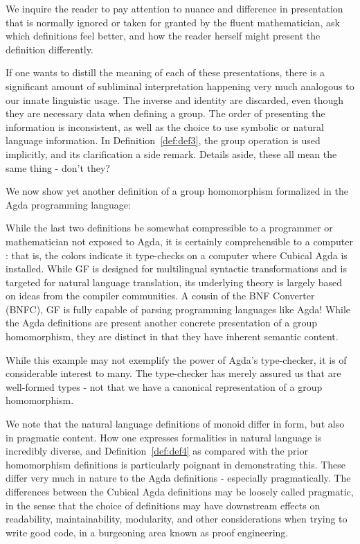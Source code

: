 We inquire the reader to pay attention to nuance and difference in presentation
that is normally ignored or taken for granted by the fluent mathematician, ask
which definitions feel better, and how the reader herself might present the
definition differently.

If one wants to distill the meaning of each of these presentations, there is a
significant amount of subliminal interpretation happening very much analogous to
our innate linguistic usage. The inverse and identity are discarded, even though
they are necessary data when defining a group. The order of presenting the
information is inconsistent, as well as the choice to use symbolic or natural
language information. In Definition~\ref{def:def3}, the group operation is used
implicitly, and its clarification a side remark. Details aside, these all mean
the same thing - don't they?


We now show yet another definition of a group homomorphism formalized in the
Agda programming language:



While the last two definitions be somewhat compressible to a programmer
or mathematician not exposed to Agda, it is certainly comprehensible to a
computer : that is, the colors indicate it type-checks on a computer where Cubical Agda is installed.
While GF is designed for multilingual syntactic transformations and is targeted
for natural language translation, its underlying theory is largely based on
ideas from the compiler communities. A cousin of the BNF Converter (BNFC), GF is
fully capable of parsing programming languages like Agda! While the Agda
definitions are present another concrete presentation of a group
homomorphism, they are distinct in that they have inherent semantic content.

While this example may not exemplify the power of Agda's type-checker, it is of
considerable interest to many. The type-checker has merely assured us that
 are well-formed types - not that we have a canonical representation
of a group homomorphism.

We note that the natural
language definitions of monoid differ in form, but also in pragmatic content.
How one expresses formalities in natural language is incredibly diverse, and
Definition~\ref{def:def4} as compared with the prior homomorphism definitions is
particularly poignant in demonstrating this. These differ very much in nature to
the Agda definitions - especially pragmatically.
The differences between the Cubical
Agda definitions may be loosely called pragmatic, in the sense that the choice
of definitions may have downstream effects on readability, maintainability, modularity, and other
considerations when trying to write good code, in a burgeoning area known as proof engineering.

